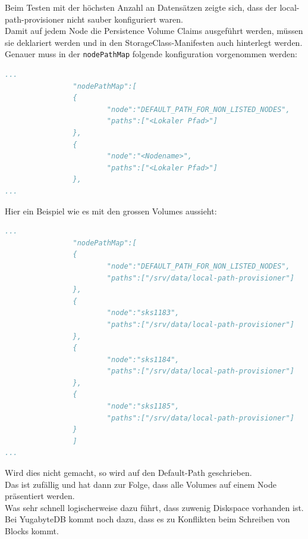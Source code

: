 \begin{flushleft}
    Beim Testen mit der höchsten Anzahl an Datensätzen zeigte sich, dass der \gls{local-path-provisioner} nicht sauber konfiguriert waren.\\
    Damit auf jedem Node die Persistence Volume Claims ausgeführt werden, müssen sie deklariert werden und in den StorageClass-Manifesten auch hinterlegt werden.\\
    Genauer muss in der \texttt{nodePathMap} folgende konfiguration vorgenommen werden:
\lstset{style=gra_codestyle}
\begin{lstlisting}[language=yaml, caption=local-path-provisioner nodePathMap,captionpos=b,label={lst:local-path-provisioner_nodePathMap},breaklines=true]
...
                "nodePathMap":[
                {
                        "node":"DEFAULT_PATH_FOR_NON_LISTED_NODES",
                        "paths":["<Lokaler Pfad>"]
                },
                {
                        "node":"<Nodename>",
                        "paths":["<Lokaler Pfad>"]
                },
...
\end{lstlisting}
    Hier ein Beispiel wie es mit den grossen Volumes aussieht:
\lstset{style=gra_codestyle}
\begin{lstlisting}[language=yaml, caption=local-path-provisioner nodePathMap Beispiel,captionpos=b,label={lst:local-path-provisioner_nodePathMap-exampl},breaklines=true]
...
                "nodePathMap":[
                {
                        "node":"DEFAULT_PATH_FOR_NON_LISTED_NODES",
                        "paths":["/srv/data/local-path-provisioner"]
                },
                {
                        "node":"sks1183",
                        "paths":["/srv/data/local-path-provisioner"]
                },
                {
                        "node":"sks1184",
                        "paths":["/srv/data/local-path-provisioner"]
                },
                {
                        "node":"sks1185",
                        "paths":["/srv/data/local-path-provisioner"]
                }
                ]
...
\end{lstlisting}
    Wird dies nicht gemacht, so wird auf den Default-Path geschrieben.\\
    Das ist zufällig und hat dann zur Folge, dass alle Volumes auf einem Node präsentiert werden.\\
    Was sehr schnell logischerweise dazu führt, dass zuwenig Diskspace vorhanden ist.\\
    Bei YugabyteDB kommt noch dazu, dass es zu Konflikten beim Schreiben von Blocks kommt.
\end{flushleft}
